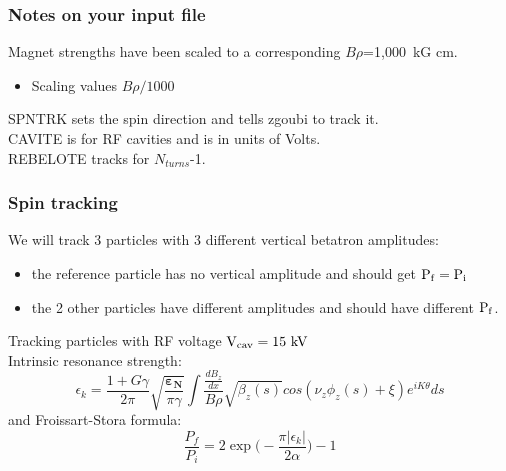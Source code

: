 \documentclass{beamer}
\begin{document}
\begin{frame}
\frametitle{Notes on your input file}
Magnet strengths have been scaled to a corresponding $B\rho$=1,000~kG cm.
\begin{itemize}
\item Scaling values $B\rho/1000$
\end{itemize}
SPNTRK sets the spin direction and tells zgoubi to track it.\\
CAVITE is for RF cavities and is in units of Volts.\\
REBELOTE tracks for $N_{turns}$-1.\\


\end{frame}

\begin{frame}
\frametitle{Spin tracking}

We will track 3 particles with 3 different vertical betatron amplitudes:
\begin{itemize}
\item the reference particle has no vertical amplitude and should get $\rm P_f=P_i$
\item the 2 other particles have different amplitudes and should have different $\rm P_f$.
\end{itemize}
Tracking particles with RF voltage $\rm V_{cav}=15~kV$\\

Intrinsic resonance strength:
\small{
\begin{equation}
\epsilon_k=\frac{1+G\gamma}{2\pi}\sqrt{\frac{\pmb{\varepsilon_N}}{\pi\gamma}}\int\frac{\frac{dB_z}{dx}}{B\rho}\sqrt{\beta_z(s)}cos(\nu_z\phi_z(s)+\xi)e^{iK\theta}ds
\end{equation}
}
\normalsize
and
Froissart-Stora formula:
\small{
\begin{equation}
\frac{P_f}{P_i}=2\exp\bigg(-\frac{\pi|\epsilon_k|}{2\alpha}\bigg)-1
\end{equation}
}

\end{frame}
\end{document}
